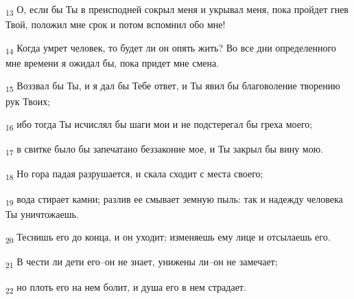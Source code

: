 \begin{tcolorbox}
\textsubscript{13} О, если бы Ты в преисподней сокрыл меня и укрывал меня, пока пройдет гнев Твой, положил мне срок и потом вспомнил обо мне!
\end{tcolorbox}
\begin{tcolorbox}
\textsubscript{14} Когда умрет человек, то будет ли он опять жить? Во все дни определенного мне времени я ожидал бы, пока придет мне смена.
\end{tcolorbox}
\begin{tcolorbox}
\textsubscript{15} Воззвал бы Ты, и я дал бы Тебе ответ, и Ты явил бы благоволение творению рук Твоих;
\end{tcolorbox}
\begin{tcolorbox}
\textsubscript{16} ибо тогда Ты исчислял бы шаги мои и не подстерегал бы греха моего;
\end{tcolorbox}
\begin{tcolorbox}
\textsubscript{17} в свитке было бы запечатано беззаконие мое, и Ты закрыл бы вину мою.
\end{tcolorbox}
\begin{tcolorbox}
\textsubscript{18} Но гора падая разрушается, и скала сходит с места своего;
\end{tcolorbox}
\begin{tcolorbox}
\textsubscript{19} вода стирает камни; разлив ее смывает земную пыль: так и надежду человека Ты уничтожаешь.
\end{tcolorbox}
\begin{tcolorbox}
\textsubscript{20} Теснишь его до конца, и он уходит; изменяешь ему лице и отсылаешь его.
\end{tcolorbox}
\begin{tcolorbox}
\textsubscript{21} В чести ли дети его--он не знает, унижены ли--он не замечает;
\end{tcolorbox}
\begin{tcolorbox}
\textsubscript{22} но плоть его на нем болит, и душа его в нем страдает.
\end{tcolorbox}
